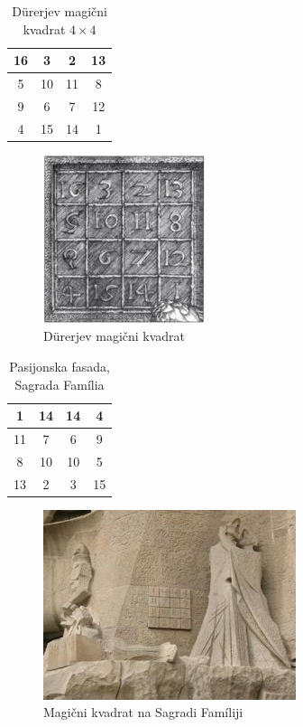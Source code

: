 \documentclass[a4paper,12pt]{article}
\newenvironment{magic}[3]
{
   \begin{table}[!ht]
      \centering
      \caption{#2}
      \label{#3}
      \large
      \begin{tabular}{#1}
         \hline 
}{
      \end{tabular}
      \normalsize
   \end{table}
}
\theoremstyle{definition}
\theoremstyle{definition}
\begin{document}
\begin{magic}{|c|c|c|c|}{Dürerjev magični kvadrat $ 4 \times 4 $}{KvadDurer}
   16 &  3 &  2 & 13 \\\hline
   5  & 10 & 11 &  8 \\\hline
   9  &  6 &  7 & 12 \\\hline
   4  & 15 & 14 &  1 \\\hline
\end{magic}

\begin{figure}[!ht]
   \centering
   \caption{Dürerjev magični kvadrat}
   \label{Durerjev kvadrat}
   \includegraphics[scale=1.3]{durer.png} 
\end{figure}


\begin{magic}{|c|c|c|c|}{Pasijonska fasada, Sagrada Família}{KvadSagrada}
   1  & 14 & 14 &  4 \\\hline
   11 &  7 &  6 &  9 \\\hline
   8  & 10 & 10 &  5 \\\hline
   13 &  2 &  3 & 15 \\\hline
\end{magic}

\begin{figure}[!ht]
   \centering
   \caption{Magični kvadrat na Sagradi Famíliji}
   \label{Sagradi kvadrat}
   \includegraphics[scale=.45]{sagrada.png}
\end{figure}
\end{document}
